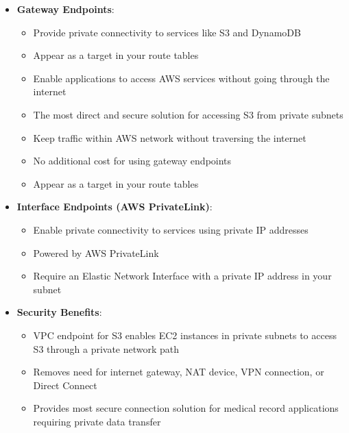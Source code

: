 \documentclass[11pt,a4paper]{report}
\begin{document}
\begin{itemize}
\begin{itemize}
  \item More cost-effective than using NAT gateways or internet gateways for S3 access from private subnets
  \item Gateway VPC endpoints provide private connectivity to S3 without requiring internet access
  \item Perfect solution for EC2 instances that need to access S3 without internet connectivity
  \item Enables applications to process S3 data securely within a VPC's private network
  \item Gateway endpoints appear as a target in your route tables
\end{itemize}
  \item \textbf{Gateway Endpoints}:
\begin{itemize}
  \item Provide private connectivity to services like S3 and DynamoDB
  \item Appear as a target in your route tables
  \item Enable applications to access AWS services without going through the internet
  \item The most direct and secure solution for accessing S3 from private subnets
  \item Keep traffic within AWS network without traversing the internet
  \item No additional cost for using gateway endpoints
  \item Appear as a target in your route tables
\end{itemize}
  \item \textbf{Interface Endpoints (AWS PrivateLink)}:
\begin{itemize}
  \item Enable private connectivity to services using private IP addresses
  \item Powered by AWS PrivateLink
  \item Require an Elastic Network Interface with a private IP address in your subnet
\end{itemize}
  \item \textbf{Security Benefits}:
\begin{itemize}
  \item VPC endpoint for S3 enables EC2 instances in private subnets to access S3 through a private network path
  \item Removes need for internet gateway, NAT device, VPN connection, or Direct Connect
  \item Provides most secure connection solution for medical record applications requiring private data transfer

\end{itemize}
\end{itemize}
\end{document}

